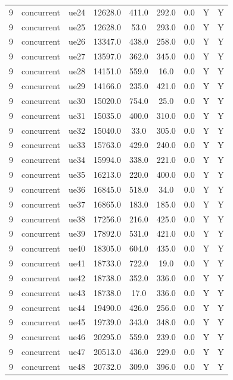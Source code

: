 \begin{table}[ht]
\begin{tabular}{|c|c|c|c|c|c|c|c|c|}
9 & concurrent & ue24 & 12628.0 & 411.0 & 292.0 & 0.0 & Y & Y \\
9 & concurrent & ue25 & 12628.0 & 53.0 & 293.0 & 0.0 & Y & Y \\
9 & concurrent & ue26 & 13347.0 & 438.0 & 258.0 & 0.0 & Y & Y \\
9 & concurrent & ue27 & 13597.0 & 362.0 & 345.0 & 0.0 & Y & Y \\
9 & concurrent & ue28 & 14151.0 & 559.0 & 16.0 & 0.0 & Y & Y \\
9 & concurrent & ue29 & 14166.0 & 235.0 & 421.0 & 0.0 & Y & Y \\
9 & concurrent & ue30 & 15020.0 & 754.0 & 25.0 & 0.0 & Y & Y \\
9 & concurrent & ue31 & 15035.0 & 400.0 & 310.0 & 0.0 & Y & Y \\
9 & concurrent & ue32 & 15040.0 & 33.0 & 305.0 & 0.0 & Y & Y \\
9 & concurrent & ue33 & 15763.0 & 429.0 & 240.0 & 0.0 & Y & Y \\
9 & concurrent & ue34 & 15994.0 & 338.0 & 221.0 & 0.0 & Y & Y \\
9 & concurrent & ue35 & 16213.0 & 220.0 & 400.0 & 0.0 & Y & Y \\
9 & concurrent & ue36 & 16845.0 & 518.0 & 34.0 & 0.0 & Y & Y \\
9 & concurrent & ue37 & 16865.0 & 183.0 & 185.0 & 0.0 & Y & Y \\
9 & concurrent & ue38 & 17256.0 & 216.0 & 425.0 & 0.0 & Y & Y \\
9 & concurrent & ue39 & 17892.0 & 531.0 & 421.0 & 0.0 & Y & Y \\
9 & concurrent & ue40 & 18305.0 & 604.0 & 435.0 & 0.0 & Y & Y \\
9 & concurrent & ue41 & 18733.0 & 722.0 & 19.0 & 0.0 & Y & Y \\
9 & concurrent & ue42 & 18738.0 & 352.0 & 336.0 & 0.0 & Y & Y \\
9 & concurrent & ue43 & 18738.0 & 17.0 & 336.0 & 0.0 & Y & Y \\
9 & concurrent & ue44 & 19490.0 & 426.0 & 256.0 & 0.0 & Y & Y \\
9 & concurrent & ue45 & 19739.0 & 343.0 & 348.0 & 0.0 & Y & Y \\
9 & concurrent & ue46 & 20295.0 & 559.0 & 239.0 & 0.0 & Y & Y \\
9 & concurrent & ue47 & 20513.0 & 436.0 & 229.0 & 0.0 & Y & Y \\
9 & concurrent & ue48 & 20732.0 & 309.0 & 396.0 & 0.0 & Y & Y \\

\end{tabular}
\end{table}
